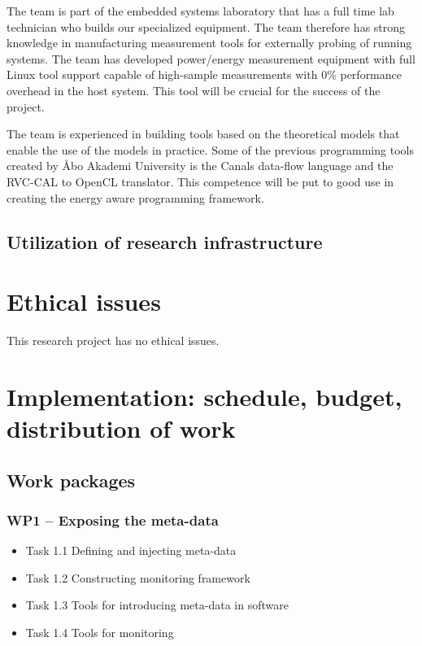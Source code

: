 \documentclass{article}
\begin{document}
The team is part of the embedded systems laboratory that has a full time lab technician who builds our specialized equipment. 
The team therefore has strong knowledge in manufacturing measurement tools for externally probing of running systems. 
The team has developed power/energy measurement equipment with full Linux tool support capable of high-sample measurements with 0\% performance overhead in the host system. 
This tool will be crucial for the success of the project.

The team is experienced in building tools based on the theoretical models that enable the use of the models in practice. 
Some of the previous programming tools created by \AA{}bo Akademi University is the Canals data-flow language and the RVC-CAL to OpenCL translator. 
This competence will be put to good use in creating the energy aware programming framework.

\subsection{Utilization of research infrastructure}

\section{Ethical issues}
This research project has no ethical issues.

\section{Implementation: schedule, budget, distribution of work}

\subsection{Work packages}
\subsubsection{WP1 -- Exposing the meta-data}
\begin{itemize}
 \item Task 1.1 Defining and injecting meta-data
 \item Task 1.2 Constructing monitoring framework
 \item Task 1.3 Tools for introducing meta-data in software
 \item Task 1.4 Tools for monitoring
\end{itemize}
\end{document}
